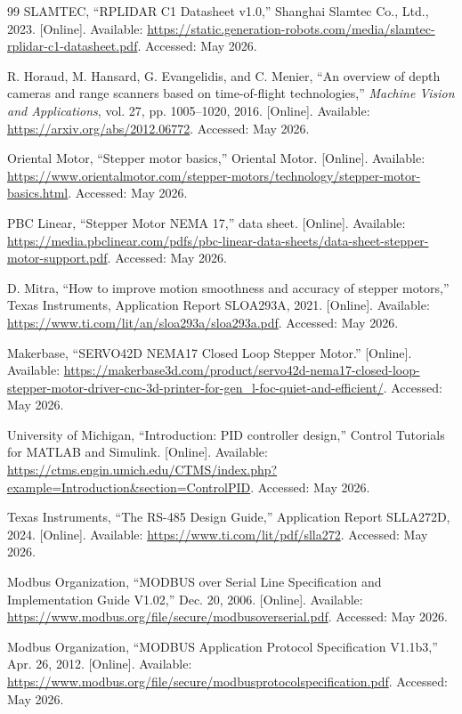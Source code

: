 \begin{thebibliography}{99}
SLAMTEC, ``RPLIDAR C1 Datasheet v1.0,'' Shanghai Slamtec Co., Ltd., 2023. [Online]. Available: \url{https://static.generation-robots.com/media/slamtec-rplidar-c1-datasheet.pdf}. Accessed: May 2026.

R. Horaud, M. Hansard, G. Evangelidis, and C. Menier, ``An overview of depth cameras and range scanners based on time-of-flight technologies,'' \textit{Machine Vision and Applications}, vol. 27, pp. 1005--1020, 2016. [Online]. Available: \url{https://arxiv.org/abs/2012.06772}. Accessed: May 2026.

Oriental Motor, ``Stepper motor basics,'' Oriental Motor. [Online]. Available: \url{https://www.orientalmotor.com/stepper-motors/technology/stepper-motor-basics.html}. Accessed: May 2026.

PBC Linear, ``Stepper Motor NEMA 17,'' data sheet. [Online]. Available: \url{https://media.pbclinear.com/pdfs/pbc-linear-data-sheets/data-sheet-stepper-motor-support.pdf}. Accessed: May 2026.

D. Mitra, ``How to improve motion smoothness and accuracy of stepper motors,'' Texas Instruments, Application Report SLOA293A, 2021. [Online]. Available: \url{https://www.ti.com/lit/an/sloa293a/sloa293a.pdf}. Accessed: May 2026.

Makerbase, ``SERVO42D NEMA17 Closed Loop Stepper Motor.'' [Online]. Available: \url{https://makerbase3d.com/product/servo42d-nema17-closed-loop-stepper-motor-driver-cnc-3d-printer-for-gen_l-foc-quiet-and-efficient/}. Accessed: May 2026.

University of Michigan, ``Introduction: PID controller design,'' Control Tutorials for MATLAB and Simulink. [Online]. Available: \url{https://ctms.engin.umich.edu/CTMS/index.php?example=Introduction&section=ControlPID}. Accessed: May 2026.

Texas Instruments, ``The RS-485 Design Guide,'' Application Report SLLA272D, 2024. [Online]. Available: \url{https://www.ti.com/lit/pdf/slla272}. Accessed: May 2026.

Modbus Organization, ``MODBUS over Serial Line Specification and Implementation Guide V1.02,'' Dec. 20, 2006. [Online]. Available: \url{https://www.modbus.org/file/secure/modbusoverserial.pdf}. Accessed: May 2026.

Modbus Organization, ``MODBUS Application Protocol Specification V1.1b3,'' Apr. 26, 2012. [Online]. Available: \url{https://www.modbus.org/file/secure/modbusprotocolspecification.pdf}. Accessed: May 2026.


\end{thebibliography}
